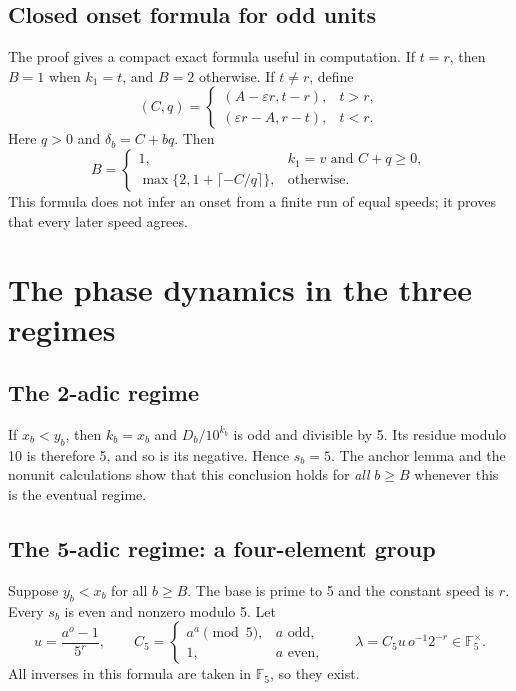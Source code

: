 \documentclass[11pt,letterpaper]{article}
\numberwithin{equation}{section}
\theoremstyle{definition}
\newcommand{\F}{\mathbb F}
\begin{document}
\subsection{Closed onset formula for odd units}\label{sec:closedB}
The proof gives a compact exact formula useful in computation. If $t=r$, then
$B=1$ when $k_1=t$, and $B=2$ otherwise. If $t\ne r$, define
\begin{equation}\label{eq:Cq}
 (C,q)=\begin{cases}(A-\varepsilon r,t-r),&t>r,\\
                         (\varepsilon r-A,r-t),&t<r.
          \end{cases}
\end{equation}
Here $q>0$ and $\delta_b=C+bq$. Then
\begin{equation}\label{eq:Bclosed}
 B=\begin{cases}
 1,&k_1=v\text{ and }C+q\geq0,\\
 \max\bigl\{2,1+\lceil-C/q\rceil\bigr\},&\text{otherwise}.
 \end{cases}
\end{equation}
This formula does not infer an onset from a finite run of equal speeds; it
proves that every later speed agrees.

\section{The phase dynamics in the three regimes}\label{sec:dynamics}

\subsection{The 2-adic regime}
If $x_b<y_b$, then $k_b=x_b$ and $D_b/10^{k_b}$ is odd and divisible by 5.
Its residue modulo 10 is therefore 5, and so is its negative. Hence $s_b=5$.
The anchor lemma and the nonunit calculations show that this conclusion holds
for \emph{all} $b\geq B$ whenever this is the eventual regime.

\subsection{The 5-adic regime: a four-element group}\label{sec:F5}
Suppose $y_b<x_b$ for all $b\geq B$. The base is prime to 5 and the constant
speed is $r$. Every $s_b$ is even and nonzero modulo 5. Let
\begin{equation}\label{eq:C5}
 u=\frac{a^o-1}{5^r},\qquad
 C_5=\begin{cases}a^a\pmod5,&a\text{ odd},\\1,&a\text{ even},\end{cases}
 \qquad \lambda=C_5u\,o^{-1}2^{-r}\in\F_5^\times.
\end{equation}
All inverses in this formula are taken in $\F_5$, so they exist.
\end{document}
